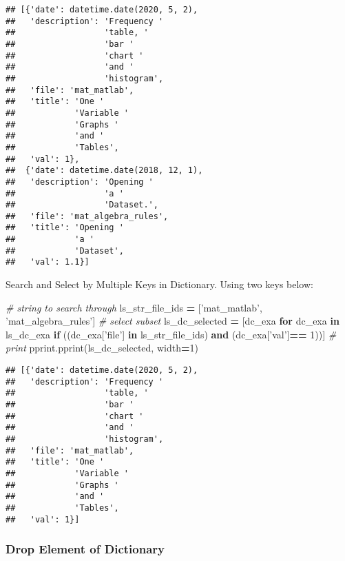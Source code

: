 \documentclass[
]{book}
\newenvironment{Shaded}{\begin{snugshade}}{\end{snugshade}}
\newcommand{\CommentTok}[1]{\textcolor[rgb]{0.56,0.35,0.01}{\textit{#1}}}
\newcommand{\ControlFlowTok}[1]{\textcolor[rgb]{0.13,0.29,0.53}{\textbf{#1}}}
\newcommand{\DecValTok}[1]{\textcolor[rgb]{0.00,0.00,0.81}{#1}}
\newcommand{\KeywordTok}[1]{\textcolor[rgb]{0.13,0.29,0.53}{\textbf{#1}}}
\newcommand{\NormalTok}[1]{#1}
\newcommand{\OperatorTok}[1]{\textcolor[rgb]{0.81,0.36,0.00}{\textbf{#1}}}
\newcommand{\StringTok}[1]{\textcolor[rgb]{0.31,0.60,0.02}{#1}}
\begin{document}
\begin{verbatim}
## [{'date': datetime.date(2020, 5, 2),
##   'description': 'Frequency '
##                  'table, '
##                  'bar '
##                  'chart '
##                  'and '
##                  'histogram',
##   'file': 'mat_matlab',
##   'title': 'One '
##            'Variable '
##            'Graphs '
##            'and '
##            'Tables',
##   'val': 1},
##  {'date': datetime.date(2018, 12, 1),
##   'description': 'Opening '
##                  'a '
##                  'Dataset.',
##   'file': 'mat_algebra_rules',
##   'title': 'Opening '
##            'a '
##            'Dataset',
##   'val': 1.1}]
\end{verbatim}

Search and Select by Multiple Keys in Dictionary. Using two keys below:

\begin{Shaded}
\begin{Highlighting}[]
\CommentTok{# string to search through}
\NormalTok{ls_str_file_ids }\OperatorTok{=}\NormalTok{ [}\StringTok{'mat_matlab'}\NormalTok{, }\StringTok{'mat_algebra_rules'}\NormalTok{]}
\CommentTok{# select subset}
\NormalTok{ls_dc_selected }\OperatorTok{=}\NormalTok{ [dc_exa}
                  \ControlFlowTok{for}\NormalTok{ dc_exa }\KeywordTok{in}\NormalTok{ ls_dc_exa}
                  \ControlFlowTok{if}\NormalTok{ ((dc_exa[}\StringTok{'file'}\NormalTok{] }\KeywordTok{in}\NormalTok{ ls_str_file_ids)}
                      \KeywordTok{and}
\NormalTok{                      (dc_exa[}\StringTok{'val'}\NormalTok{]}\OperatorTok{==} \DecValTok{1}\NormalTok{))]}
\CommentTok{# print}
\NormalTok{pprint.pprint(ls_dc_selected, width}\OperatorTok{=}\DecValTok{1}\NormalTok{)}
\end{Highlighting}
\end{Shaded}

\begin{verbatim}
## [{'date': datetime.date(2020, 5, 2),
##   'description': 'Frequency '
##                  'table, '
##                  'bar '
##                  'chart '
##                  'and '
##                  'histogram',
##   'file': 'mat_matlab',
##   'title': 'One '
##            'Variable '
##            'Graphs '
##            'and '
##            'Tables',
##   'val': 1}]
\end{verbatim}

\hypertarget{drop-element-of-dictionary}{%
\subsubsection{Drop Element of Dictionary}\label{drop-element-of-dictionary}}
\end{document}
